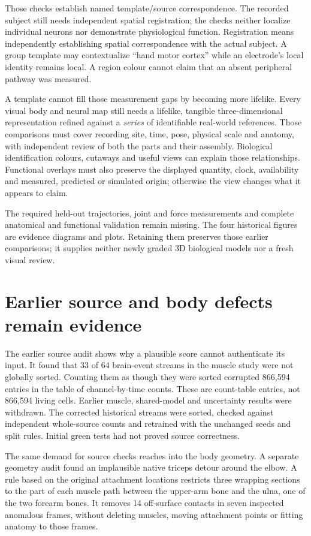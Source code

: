 Those checks establish named template/source correspondence. The recorded subject still needs independent spatial registration; the checks neither localize individual neurons nor demonstrate physiological function. Registration means independently establishing spatial correspondence
with the actual subject. A group template may contextualize ``hand motor
cortex'' while an electrode's local identity remains local. A region colour
cannot claim that an absent peripheral pathway was measured.

A template cannot fill those measurement gaps by becoming more lifelike. Every visual body and neural map still needs a lifelike, tangible three-dimensional representation refined against a \emph{series} of identifiable real-world references. Those comparisons must cover recording site, time, pose, physical scale and anatomy, with independent review of both the parts and their assembly. Biological identification colours, cutaways and useful views can explain those relationships. Functional overlays must also preserve the displayed quantity, clock, availability and measured, predicted or simulated origin; otherwise the view changes what it appears to claim.

The required held-out trajectories, joint and force measurements and complete anatomical and functional validation remain missing. The four historical figures are evidence diagrams and plots. Retaining them preserves those earlier comparisons; it supplies neither newly graded 3D biological models nor a fresh visual review.


\section{Earlier source and body defects remain evidence}

The earlier source audit shows why a plausible score cannot authenticate its input. It found that 33 of 64 brain-event streams in the muscle study were
not globally sorted. Counting them as though they were sorted corrupted
866,594 entries in the table of channel-by-time counts. These are count-table
entries, not 866,594 living cells. Earlier muscle, shared-model and uncertainty
results were withdrawn.
The corrected historical streams were sorted, checked against independent whole-source counts
and retrained with the unchanged seeds and split rules. Initial green tests
had not proved source correctness.

The same demand for source checks reaches into the body geometry. A separate geometry audit found an implausible native triceps detour around
the elbow. A rule based on the original attachment locations restricts three
wrapping sections to the part of each muscle path between the upper-arm bone
and the ulna, one of the two forearm bones. It removes 14
off-surface contacts in seven inspected anomalous frames, without deleting
muscles, moving attachment points or fitting anatomy to those frames.

